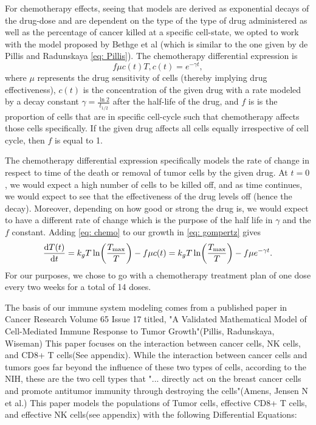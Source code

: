 \documentclass[11pt]{amsart}
\begin{document}
For chemotherapy effects, seeing that models are derived as exponential decays of the drug-dose and are dependent on the type of the type of drug administered as well as the percentage of cancer killed at a specific cell-state, we opted to work with the model proposed by Bethge et al (which is similar to the one given by de Pillis and Radunskaya \eqref{eq: Pillis}). The chemotherapy differential expression is 
\begin{equation}
	f \mu c(t) T, c(t) = e^{-\gamma t} \label{eq: chemo},
\end{equation}
where $\mu$ represents the drug sensitivity of cells (thereby implying drug effectiveness), $c(t)$ is the concentration of the given drug with a rate modeled by a decay constant $\gamma=\frac{\ln{2}}{t_{1/2}}$ after the half-life of the drug, and $f$ is is the proportion of cells that are in specific cell-cycle such that chemotherapy affects those cells specifically.
If the given drug affects all cells equally irrespective of cell cycle, then $f$ is equal to 1.

The chemotherapy differential expression specifically models the rate of change in respect to time of the death or removal of tumor cells by the given drug.
At $t=0$, we would expect a high number of cells to be killed off, and as time continues, we would expect to see that the effectiveness of the drug levels off (hence the decay).
Moreover, depending on how good or strong the drug is, we would expect to have a different rate of change which is the purpose of the half life in $\gamma$ and the $f$ constant.
Adding \eqref{eq: chemo} to our growth in \eqref{eq: gompertz} gives 
\begin{equation}
	\frac{\mathop{}\!\mathrm{d} T(t)}{\mathop{}\!\mathrm{d} t} = k_g T \ln \biggl(\frac{T_{\max}}{T} \biggr) - f \mu c(t) =k_g T \ln \biggl(\frac{T_{\max}}{T} \biggr) - f \mu e^{-\gamma t} \label{eq: gompertz-chemo}.
\end{equation}
For our purposes, we chose to go with a chemotherapy treatment plan of one dose every two weeks for a total of 14 doses. 


The basis of our immune system modeling comes from a published paper in Cancer Research Volume 65 Issue 17 titled, 
"A Validated Mathematical Model of Cell-Mediated Immune Response to Tumor Growth"(Pillis, Radunskaya, Wiseman)
This paper focuses on the interaction between cancer cells, NK cells, and CD8+ T cells(See appendix). 
While the interaction between cancer cells and tumors goes far beyond the influence of these two types of cells, 
according to the NIH, these are the two cell types that "... directly act on the breast cancer cells and promote antitumor immunity through destroying the cells"(Amens, Jensen N et al.)
This paper models the populations of Tumor cells, effective CD8+ T cells, and effective NK cells(see appendix) with the following Differential Equations:
\end{document}
